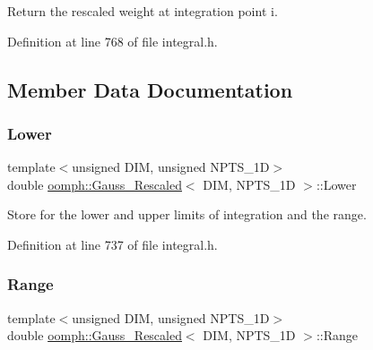 Return the rescaled weight at integration point i. 



Definition at line 768 of file integral.\+h.



\subsection{Member Data Documentation}
\mbox{\label{classoomph_1_1Gauss__Rescaled_a262c62b0e60955110b0a96f535d45637}} 
\subsubsection{\texorpdfstring{Lower}{Lower}}
{\footnotesize\ttfamily template$<$unsigned D\+IM, unsigned N\+P\+T\+S\+\_\+1D$>$ \\
double \hyperlink{classoomph_1_1Gauss__Rescaled}{oomph\+::\+Gauss\+\_\+\+Rescaled}$<$ D\+IM, N\+P\+T\+S\+\_\+1D $>$\+::Lower\hspace{0.3cm}{\ttfamily [private]}}



Store for the lower and upper limits of integration and the range. 



Definition at line 737 of file integral.\+h.

\mbox{\label{classoomph_1_1Gauss__Rescaled_a7e672d9297429ca22f6ace978ec6893e}} 
\subsubsection{\texorpdfstring{Range}{Range}}
{\footnotesize\ttfamily template$<$unsigned D\+IM, unsigned N\+P\+T\+S\+\_\+1D$>$ \\
double \hyperlink{classoomph_1_1Gauss__Rescaled}{oomph\+::\+Gauss\+\_\+\+Rescaled}$<$ D\+IM, N\+P\+T\+S\+\_\+1D $>$\+::Range\hspace{0.3cm}{\ttfamily [private]}}



